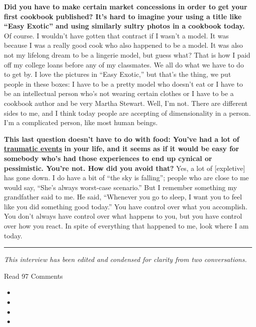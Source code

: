 \textbf{Did you have to make certain market concessions in order to get
your first cookbook published? It's hard to imagine your using a title
like ``Easy Exotic'' and using similarly sultry photos in a cookbook
today.} Of course. I wouldn't have gotten that contract if I wasn't a
model. It was because I was a really good cook who also happened to be a
model. It was also not my lifelong dream to be a lingerie model, but
guess what? That is how I paid off my college loans before any of my
classmates. We all do what we have to do to get by. I love the pictures
in ``Easy Exotic,'' but that's the thing, we put people in these boxes:
I have to be a pretty model who doesn't eat or I have to be an
intellectual person who's not wearing certain clothes or I have to be a
cookbook author and be very Martha Stewart. Well, I'm not. There are
different sides to me, and I think today people are accepting of
dimensionality in a person. I'm a complicated person, like most human
beings.

\textbf{This last question doesn't have to do with food: You've had a
lot of} \textbf{\href{http://nytimes.com\#tooltip-12}{traumatic events}}
\textbf{in your life, and it seems as if it would be easy for somebody
who's had those experiences to end up cynical or pessimistic. You're
not. How did you avoid that?} Yes, a lot of {[}expletive{]} has gone
down. I do have a bit of ``the sky is falling''; people who are close to
me would say, ``She's always worst-case scenario.'' But I remember
something my grandfather said to me. He said, ``Whenever you go to
sleep, I want you to feel like you did something good today.'' You have
control over what you accomplish. You don't always have control over
what happens to you, but you have control over how you react. In spite
of everything that happened to me, look where I am today.

\begin{center}\rule{0.5\linewidth}{\linethickness}\end{center}

\emph{This interview has been edited and condensed for clarity from two
conversations.}

Read 97 Comments

\begin{itemize}
\item
\item
\item
\item
\end{itemize}

